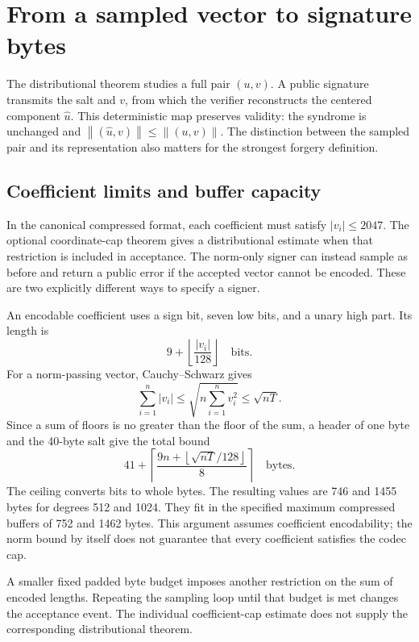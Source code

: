 \documentclass[11pt,a4paper]{article}
\newcommand{\norm}[1]{\left\lVert#1\right\rVert}
\theoremstyle{definition}
\theoremstyle{remark}
\numberwithin{equation}{section}
\begin{document}
\section{From a sampled vector to signature bytes}
\label{sec:representation}

The distributional theorem studies a full pair $(u,v)$. A public signature transmits the salt and $v$, from which the verifier reconstructs the centered component $\widehat u$. This deterministic map preserves validity: the syndrome is unchanged and $\norm{(\widehat u,v)}\le\norm{(u,v)}$. The distinction between the sampled pair and its representation also matters for the strongest forgery definition.

\subsection{Coefficient limits and buffer capacity}

In the canonical compressed format, each coefficient must satisfy $|v_i|\le2047$. The optional coordinate-cap theorem gives a distributional estimate when that restriction is included in acceptance. The norm-only signer can instead sample as before and return a public error if the accepted vector cannot be encoded. These are two explicitly different ways to specify a signer.

An encodable coefficient uses a sign bit, seven low bits, and a unary high part. Its length is
\[
 9+\left\lfloor\frac{|v_i|}{128}\right\rfloor
 \quad\text{bits}.
\]
For a norm-passing vector, Cauchy--Schwarz gives
\[
 \sum_{i=1}^n |v_i|\le\sqrt{n\sum_{i=1}^n v_i^2}
 \le\sqrt{nT}.
\]
Since a sum of floors is no greater than the floor of the sum, a header of one byte and the 40-byte salt give the total bound
\begin{equation}
 41+\left\lceil
 \frac{9n+\left\lfloor\sqrt{nT}/128\right\rfloor}{8}
 \right\rceil
 \quad\text{bytes}.
 \label{eq:compressed-buffer}
\end{equation}
The ceiling converts bits to whole bytes. The resulting values are 746 and 1455 bytes for degrees 512 and 1024. They fit in the specified maximum compressed buffers of 752 and 1462 bytes. This argument assumes coefficient encodability; the norm bound by itself does not guarantee that every coefficient satisfies the codec cap.

A smaller fixed padded byte budget imposes another restriction on the sum of encoded lengths. Repeating the sampling loop until that budget is met changes the acceptance event. The individual coefficient-cap estimate does not supply the corresponding distributional theorem.
\end{document}
